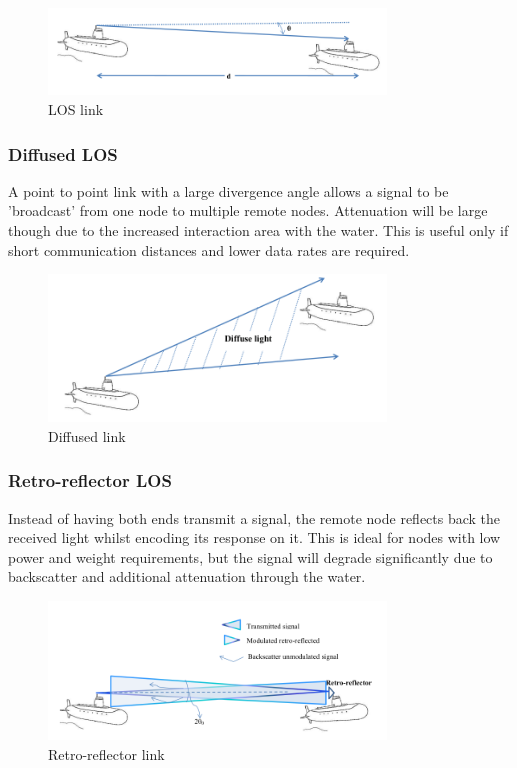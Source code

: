 \begin{figure}[H]
  \includegraphics[width=0.8\textwidth]{los-link.png}
  \caption{\ac{LOS} link \cite{kaushal_kaddoum}}
  \label{fig:los-link}
\end{figure}

\subsubsection{Diffused \ac{LOS}}
A point to point link with a large divergence angle allows a signal to be
'broadcast' from one node to multiple remote nodes. Attenuation will be large
though due to the increased interaction area with the water. This is useful
only if short communication distances and lower data rates are required.

\begin{figure}[H]
  \includegraphics[width=0.8\textwidth]{diffused-link.png}
  \caption{Diffused link \cite{kaushal_kaddoum}}
  \label{fig:diffused-link}
\end{figure}

\subsubsection{Retro-reflector \ac{LOS}}
Instead of having both ends transmit a signal, the remote node reflects back
the received light whilst encoding its response on it. This is ideal for nodes
with low power and weight requirements, but the signal will degrade
significantly due to backscatter and additional attenuation through the water.

\begin{figure}[H]
  \includegraphics[width=0.8\textwidth]{retro-reflector-link.png}
  \caption{Retro-reflector link \cite{kaushal_kaddoum}}
  \label{fig:retro-reflector-link}
\end{figure}

